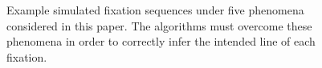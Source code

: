 \documentclass[doc,biblatex]{apa7}
\begin{document}
	\begin{figure}
	\vspace*{2pt}
	\caption{Example simulated fixation sequences under five phenomena considered in this paper. The algorithms must overcome these phenomena in order to correctly infer the intended line of each fixation.}
	\label{fig03}
	\end{figure}
\end{document}
